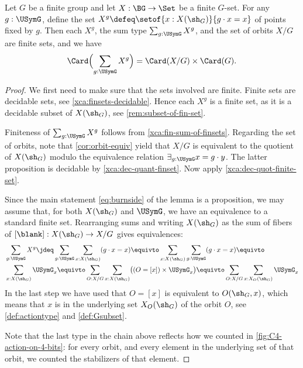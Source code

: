 \begin{lemma}
  \label{lem:burnside}
  Let $G$ be a finite group and let $X:\BG\to\Set$ be a finite $G$-set.
  For any $g:\USymG$, define the set 
  $X^g \defeq \setof{x:X(\sh_G)}{g\cdot x = x}$
  of points fixed by $g$.
  Then each $X^g$, the sum type $\sum_{g:\USymG} X^g$, 
  and the set of orbits $X/G$ are finite sets, and we have
  \begin{align}\label{eq:burnside}
    \Card\Bigl(\sum_{g:\USymG} X^g\Bigr) = \Card(X/G) \times \Card(G).
  \end{align}
\end{lemma}
\begin{proof}
  We first need to make sure that the sets involved are finite. 
  Finite sets are decidable sets, see \cref{xca:finsets-decidable}.
  Hence each $X^g$ is a finite set, as it is a decidable subset of $X(\sh_G)$,
  see \cref{rem:subset-of-fin-set}.
 
  Finiteness of $\sum_{g:\USymG} X^g$ follows from 
  \cref{xca:fin-sum-of-finsets}. Regarding the set of orbits,
  note that \cref{cor:orbit-equiv} yield that $X/G$ is equivalent
  to the quotient of $X(\sh_G)$ modulo the equivalence relation
  $\exists_{g:\USymG} x=g\cdot y$. The latter proposition is decidable by
  \cref{xca:dec-quant-finset}. Now apply \cref{xca:dec-quot-finite-set}.
  
  Since the main statement \cref{eq:burnside} of the lemma is a proposition, 
  we may assume that, for both $X(\sh_G)$ and $\USymG$, 
  we have an equivalence to a standard finite set.  
  Rearranging sums and writing $X(\sh_G)$ as the sum of fibers
  of $[\blank]: X(\sh_G)\to X/G$ gives equivalences:
  \begin{align*}
 &\sum_{g:\USymG} X^g \jdeq
 \sum_{g:\USymG}\sum_{x:X(\sh_G)}(g\cdot x = x)\equivto 
 \sum_{x:X(\sh_G)}\sum_{g:\USymG}(g\cdot x = x) \equivto \\
 &\sum_{x:X(\sh_G)} \USymG_x\equivto 
 \sum_{O:X/G} \sum_{x : X(\sh_G)} \bigl((O=[x])\times\USymG_x\bigr)\equivto 
 \sum_{O:X/G} \sum_{x : X_O(\sh_G)} \USymG_x
  \end{align*}
  In the last step we have used that $O=[x]$ is equivalent to
  $O(\sh_G,x)$, which means that $x$ is in the underlying set
  $X_O(\sh_G)$ of the orbit $O$, see \cref{def:actiontype}
  and \cref{def:Gsubset}.
  
  Note that the last type in the chain above reflects how
  we counted in \cref{fig:C4-action-on-4-bits}: for every orbit,
  and every element in the underlying set of that orbit,
  we counted the stabilizers of that element.
  

\end{proof}
